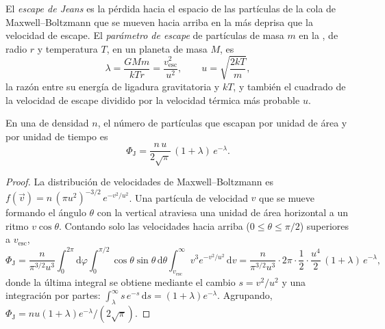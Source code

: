 \begin{definition}\label{def:b3:planetary-atmospheres:jeans-escape}
El \emph{escape de Jeans} es la pérdida hacia el espacio de las
partículas de la cola de Maxwell--Boltzmann que se mueven hacia arriba en la 
más deprisa que la velocidad de escape. El \emph{parámetro de
escape} de partículas de masa $m$ en la ,
de radio $r$ y temperatura $T$, en un planeta de masa $M$, es
\[
\lambda = \frac{GMm}{kTr} = \frac{v_\mathrm{esc}^2}{u^2},
\qquad u = \sqrt{\frac{2kT}m},
\]
la razón entre su energía de ligadura gravitatoria y $kT$, y también el
cuadrado de la velocidad de escape dividido por la velocidad térmica más probable $u$.
\end{definition}

\begin{theorem}\label{thm:b3:planetary-atmospheres:jeans}
En una  de densidad $n$, el número de partículas que escapan por unidad
de área y por unidad de tiempo es
\[
\Phi_\mathrm J = \frac{n\,u}{2\sqrt\pi}\,(1 + \lambda)\,e^{-\lambda}.
\]
\end{theorem}

\begin{proof}
La distribución de velocidades de Maxwell--Boltzmann es $f(\vec v) =
n\,(\pi u^2)^{-3/2}\,e^{-v^2/u^2}$. Una partícula de velocidad $v$ que se mueve formando el
ángulo $\theta$ con la vertical atraviesa una unidad de área horizontal a
un ritmo $v\cos\theta$. Contando solo las velocidades hacia arriba ($0 \le \theta \le
\pi/2$) superiores a $v_\mathrm{esc}$,
\[
\Phi_\mathrm J = \frac{n}{\pi^{3/2}u^3}\int_0^{2\pi}\!\!\mathrm d\varphi
\int_0^{\pi/2}\!\!\cos\theta\sin\theta\,\mathrm d\theta
\int_{v_\mathrm{esc}}^\infty v^3e^{-v^2/u^2}\,\mathrm dv
= \frac{n}{\pi^{3/2}u^3}\cdot2\pi\cdot\frac12\cdot
\frac{u^4}2\,(1 + \lambda)\,e^{-\lambda},
\]
donde la última integral se obtiene mediante el cambio $s = v^2/u^2$ y
una integración por partes: $\int_\lambda^\infty s\,e^{-s}\,\mathrm ds =
(1 + \lambda)e^{-\lambda}$. Agrupando, $\Phi_\mathrm J = n u (1 +
\lambda) e^{-\lambda}/(2\sqrt\pi)$.
\end{proof}

